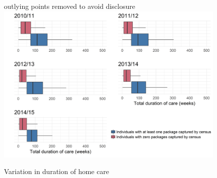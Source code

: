 \documentclass[]{article}
\begin{document}
\begin{figure}[h]
  \centering
    \caption{Variation in duration of home care}
    {\scriptsize outlying points removed to avoid disclosure}
    \includegraphics{figures/chapter-renf/17-duration.png}
    \label{fig:renf-duration}
\end{figure}
\end{document}
